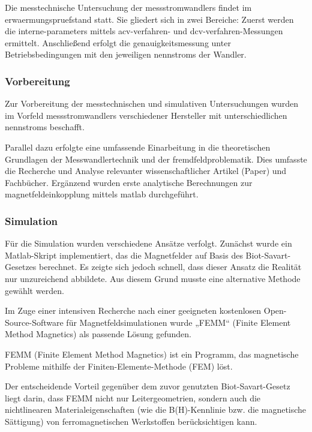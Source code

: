 Die messtechnische Untersuchung der \glspl{messstromwandler} findet im \gls{erwaermungspruefstand} statt. Sie gliedert sich in zwei Bereiche: Zuerst werden die \glspl{interne-parameter} mittels \gls{acv-verfahren}- und \gls{dcv-verfahren}-Messungen ermittelt. Anschließend erfolgt die \gls{genauigkeitsmessung} unter Betriebsbedingungen mit den jeweiligen \glspl{nennstrom} der Wandler.

\subsubsection{Vorbereitung}
\label{sec:vorgehen:vorbereitung}

Zur Vorbereitung der messtechnischen und simulativen Untersuchungen wurden im Vorfeld \glspl{messstromwandler} verschiedener Hersteller mit unterschiedlichen \glspl{nennstrom} beschafft.

Parallel dazu erfolgte eine umfassende Einarbeitung in die theoretischen Grundlagen der Messwandlertechnik und der \gls{fremdfeld}problematik. Dies umfasste die Recherche und Analyse relevanter wissenschaftlicher Artikel (Paper) und Fachbücher. Ergänzend wurden erste analytische Berechnungen zur \gls{magnetfeldeinkopplung} mittels \gls{matlab}  durchgeführt.

\subsubsection{Simulation}
\label{sec:vorgehen:simulation}


Für die Simulation wurden verschiedene Ansätze verfolgt. Zunächst wurde ein
Matlab-Skript implementiert, das die Magnetfelder auf Basis des
Biot-Savart-Gesetzes berechnet. Es zeigte sich jedoch schnell, dass dieser
Ansatz die Realität nur unzureichend abbildete. Aus diesem Grund musste eine alternative Methode gewählt werden.

Im Zuge einer intensiven Recherche nach einer geeigneten kostenlosen Open-Source-Software für Magnetfeldsimulationen wurde „FEMM“ (Finite Element Method Magnetics) als passende Lösung gefunden.

FEMM (Finite Element Method Magnetics) ist ein Programm, das magnetische Probleme mithilfe der Finiten-Elemente-Methode (FEM) löst.

Der entscheidende Vorteil gegenüber dem zuvor genutzten Biot-Savart-Gesetz liegt darin, dass FEMM nicht nur Leitergeometrien, sondern auch die nichtlinearen Materialeigenschaften (wie die B(H)-Kennlinie bzw. die magnetische Sättigung) von ferromagnetischen Werkstoffen berücksichtigen kann.

